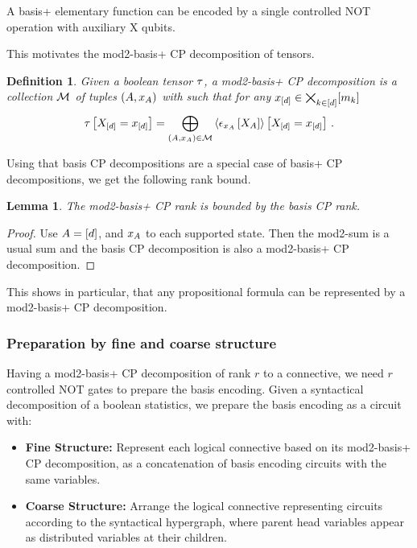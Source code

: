 \documentclass[aps,onecolumn,nofootinbib,pra]{article}
\newtheorem{lemma}{Lemma}
\newtheorem{definition}{Definition}
\begin{document}
    A basis+ elementary function can be encoded by a single controlled NOT operation with auxiliary X qubits.

    This motivates the mod2-basis+ CP decomposition of tensors.

    \begin{definition}
        Given a boolean tensor $\tau$, a mod2-basis+ CP decomposition is a collection $\mathcal{M}$ of tuples $(A,x_{A})$ with such that for any $x_{[d]}\in\bigtimes_{k\in[d]}[m_{k}]$
        \begin{align*}
            \tau\left[X_{[d]}=x_{[d]}\right]
            = \bigoplus_{(A,x_{A})\in\mathcal{M}} \left\langle \epsilon_{x_{A}}\left[X_{A}\right]\right\rangle \left[ X_{[d]}=x_{[d]} \right] \, .
        \end{align*}
    \end{definition}

    Using that basis CP decompositions are a special case of basis+ CP decompositions, we get the following rank bound.

    \begin{lemma}
        The mod2-basis+ CP rank is bounded by the basis CP rank.
    \end{lemma}
    \begin{proof}
        Use $A=[d]$, and $x_{A}$ to each supported state.
        Then the mod2-sum is a usual sum and the basis CP decomposition is also a mod2-basis+ CP decomposition.
    \end{proof}

    This shows in particular, that any propositional formula can be represented by a mod2-basis+ CP decomposition.

    \subsubsection{Preparation by fine and coarse structure}

    Having a mod2-basis+ CP decomposition of rank $r$ to a connective, we need $r$ controlled NOT gates to prepare the basis encoding.
    Given a syntactical decomposition of a boolean statistics, we prepare the basis encoding as a circuit with:
    \begin{itemize}
        \item \textbf{Fine Structure:} Represent each logical connective based on its mod2-basis+ CP decomposition, as a concatenation of basis encoding circuits with the same variables.
        \item \textbf{Coarse Structure:} Arrange the logical connective representing circuits according to the syntactical hypergraph, where parent head variables appear as distributed variables at their children.
    \end{itemize}
\end{document}
